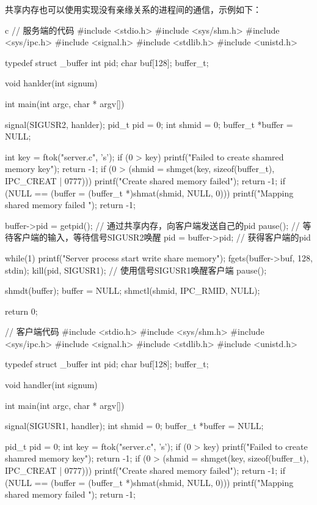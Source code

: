 共享内存也可以使用实现没有亲缘关系的进程间的通信，示例如下：
\begin{code-block}{c}
// 服务端的代码
#include <stdio.h>
#include <sys/shm.h>
#include <sys/ipc.h>
#include <signal.h>
#include <stdlib.h>
#include <unistd.h>

typedef struct _buffer{
        int pid;
        char buf[128];
}buffer_t;

void hanlder(int signum){}

int main(int argc, char * argv[])
{
        signal(SIGUSR2, hanlder);
        pid_t pid = 0;
        int shmid = 0;
        buffer_t *buffer = NULL;

        int key = ftok("server.c", 's');
        if (0 > key)
        {
                printf("Failed to create shamred memory key\n");
                return -1;
        }
        if (0 > (shmid = shmget(key, sizeof(buffer_t), IPC_CREAT | 0777)))
        {
                printf("Create shared memory failed\n");
                return -1;
        }
        if (NULL == (buffer = (buffer_t *)shmat(shmid, NULL, 0)))
        {
                printf("Mapping shared memory failed \n");
                return -1;
        }

        buffer->pid = getpid(); // 通过共享内存，向客户端发送自己的pid
        pause(); // 等待客户端的输入，等待信号SIGUSR2唤醒
        pid = buffer->pid; // 获得客户端的pid

        while(1)
        {
                printf("Server process start write share memory\n");
                fgets(buffer->buf, 128, stdin);
                kill(pid, SIGUSR1); // 使用信号SIGUSR1唤醒客户端
                pause();
        }

        shmdt(buffer);
        buffer = NULL;
        shmctl(shmid, IPC_RMID, NULL);

        return 0;
}

// 客户端代码
#include <stdio.h>
#include <sys/shm.h>
#include <sys/ipc.h>
#include <signal.h>
#include <stdlib.h>
#include <unistd.h>

typedef struct _buffer{
        int pid;
        char buf[128];
}buffer_t;

void handler(int signum){}

int main(int argc, char * argv[])
{
        signal(SIGUSR1, handler);
        int shmid = 0;
        buffer_t *buffer = NULL;

        pid_t pid = 0;
        int key = ftok("server.c", 's');
        if (0 > key)
        {
                printf("Failed to create shamred memory key\n");
                return -1;
        }
        if (0 > (shmid = shmget(key, sizeof(buffer_t), IPC_CREAT | 0777)))
        {
                printf("Create shared memory failed\n");
                return -1;
        }
        if (NULL == (buffer = (buffer_t *)shmat(shmid, NULL, 0)))
        {
                printf("Mapping shared memory failed \n");
                return -1;
        }

}
\end{code-block}
